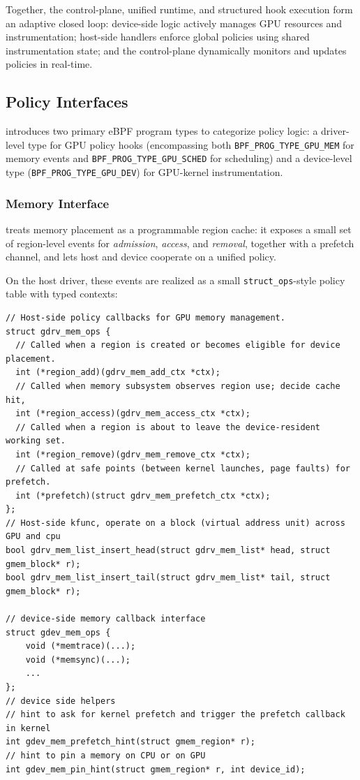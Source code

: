 Together, the control-plane, unified runtime, and structured hook execution form an adaptive closed loop: device-side logic actively manages GPU resources and instrumentation; host-side handlers enforce global policies using shared instrumentation state; and the control-plane dynamically monitors and updates policies in real-time.

\subsection{Policy Interfaces}
\label{sec:design-interfaces}

\sys introduces two primary eBPF program types to categorize policy logic:
a driver-level type for GPU policy hooks (encompassing both \texttt{BPF\_PROG\_TYPE\_GPU\_MEM} for memory events and \texttt{BPF\_PROG\_TYPE\_GPU\_SCHED} for scheduling) and a device-level type (\texttt{BPF\_PROG\_TYPE\_GPU\_DEV}) for GPU-kernel instrumentation.

\subsubsection{Memory Interface}
\label{sec:design-mem}

\sys treats memory placement as a programmable region
cache: it exposes a small set of region-level events for \emph{admission},
\emph{access}, and \emph{removal}, together with a prefetch channel, and lets host
and device cooperate on a unified policy.

On the host driver, these events are realized as a small \texttt{struct\_ops}-style policy
table with typed contexts:

\begin{verbatim}
// Host-side policy callbacks for GPU memory management.
struct gdrv_mem_ops {
  // Called when a region is created or becomes eligible for device placement.
  int (*region_add)(gdrv_mem_add_ctx *ctx);
  // Called when memory subsystem observes region use; decide cache hit,
  int (*region_access)(gdrv_mem_access_ctx *ctx);
  // Called when a region is about to leave the device-resident working set.
  int (*region_remove)(gdrv_mem_remove_ctx *ctx);
  // Called at safe points (between kernel launches, page faults) for prefetch.
  int (*prefetch)(struct gdrv_mem_prefetch_ctx *ctx);
};
// Host-side kfunc, operate on a block (virtual address unit) across GPU and cpu
bool gdrv_mem_list_insert_head(struct gdrv_mem_list* head, struct gmem_block* r);
bool gdrv_mem_list_insert_tail(struct gdrv_mem_list* tail, struct gmem_block* r);

// device-side memory callback interface
struct gdev_mem_ops {
    void (*memtrace)(...);
    void (*memsync)(...);
    ...
};
// device side helpers
// hint to ask for kernel prefetch and trigger the prefetch callback in kernel
int gdev_mem_prefetch_hint(struct gmem_region* r);
// hint to pin a memory on CPU or on GPU
int gdev_mem_pin_hint(struct gmem_region* r, int device_id);
\end{verbatim}

